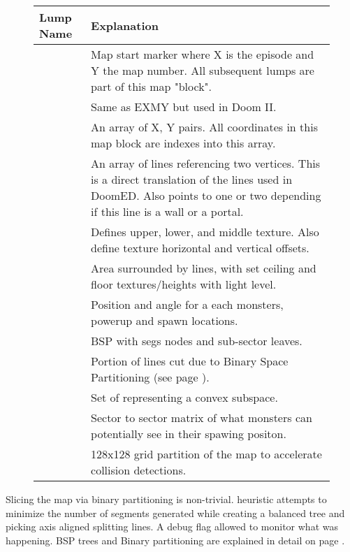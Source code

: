 \par
 \begin{figure}[H]
\centering  
\begin{tabularx}{\textwidth}{ L{0.15} L{0.75} }
  \toprule
  \textbf{Lump Name} &  \textbf{Explanation} \\
  \toprule 
   
    & Map start marker where X is the episode and Y the map number. All subsequent lumps are part of this map "block".\\
    & Same as EXMY but used in Doom II.\\
    & An array of  X, Y pairs. All coordinates in this map block are indexes into this array.\\
    & An array of lines referencing two vertices. This is a direct translation of the lines used in DoomED. Also points to one or two  depending if this line is a wall or a portal. \\
    & Defines upper, lower, and middle texture. Also define texture horizontal and vertical offsets.\\
    & Area surrounded by lines, with set ceiling and floor textures/heights with light level.\\
    & Position and angle for a each monsters, powerup and spawn locations.\\
   \toprule
    & BSP with segs nodes and sub-sector leaves.\\
    & Portion of lines cut due to Binary Space Partitioning (see page \pageref{Binary Space Partitioning: Theory}).\\
    & Set of  representing a convex subspace.\\
   \toprule
    & Sector to sector matrix of what monsters can potentially see in their spawing positon.\\
   \toprule
    & 128x128 grid partition of the map  to accelerate collision detections.\\
   \toprule
\end{tabularx}
\end{figure}
\par
{}

Slicing the map via binary partitioning is non-trivial.  heuristic attempts to minimize the number of segments generated while creating a balanced tree and picking axis aligned splitting lines. A debug flag  allowed to monitor what was happening. BSP trees and Binary partitioning are explained in detail on page \pageref{Binary Space Partitioning: Theory}. \\
\par
{}
\par
